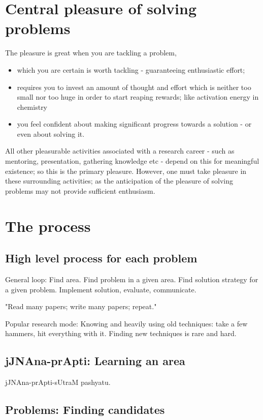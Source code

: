 \documentclass[oneside, article]{memoir}
\begin{document}
\section{Central pleasure of solving problems}
The pleasure is great when you are tackling a problem,
\begin{itemize}
\item which you are certain is worth tackling - guaranteeing enthusiastic effort; 
\item requires you to invest an amount of thought and effort which is neither too small nor too huge in order to start reaping rewards; like activation energy in chemistry
\item you feel confident about making significant progress towards a solution - or even about solving it.
\end{itemize}

All other pleasurable activities associated with a research career - such as mentoring, presentation, gathering knowledge etc - depend on this for meaningful existence; so this is the primary pleasure. However, one must take pleasure in these surrounding activities; as the anticipation of the pleasure of solving problems may not provide sufficient enthusiasm.

\section{The process}
\subsection{High level process for each problem}
General loop: Find area. Find problem in a given area. Find solution strategy for a given problem. Implement solution, evaluate, communicate.

"Read many papers; write many papers; repeat."

Popular research mode: Knowing and heavily using old techniques: take a few hammers, hit everything with it. Finding new techniques is rare and hard.

\subsection{jJNAna-prApti: Learning an area}
jJNAna-prApti-sUtraM pashyatu.


\subsection{Problems: Finding candidates}
\end{document}
